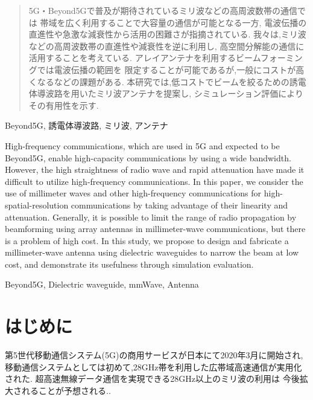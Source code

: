 \documentclass[technicalreport]{ieicej}
\begin{document}
\begin{abstract}
  5G・Beyond5Gで普及が期待されているミリ波などの高周波数帯の通信では
  帯域を広く利用することで大容量の通信が可能となる一方,
  電波伝播の直進性や急激な減衰性から活用の困難さが指摘されている.
  我々は,ミリ波などの高周波数帯の直進性や減衰性を逆に利用し,
  高空間分解能の通信に活用することを考えている.
  アレイアンテナを利用するビームフォーミングでは電波伝播の範囲を
  限定することが可能であるが,一般にコストが高くなるなどの課題がある.
  本研究では,低コストでビームを絞るための誘電体導波路を用いたミリ波アンテナを提案し,
  シミュレーション評価によりその有用性を示す.
\end{abstract}
\begin{keyword}
Beyond5G, 誘電体導波路, ミリ波, アンテナ
\end{keyword}
\begin{eabstract}
High-frequency communications,
which are used in 5G and expected to be Beyond5G,
enable high-capacity communications by using a wide bandwidth.
However, the high straightness of radio wave
and rapid attenuation
have made it difficult to utilize high-frequency communications.
In this paper, we consider the use of millimeter waves and
other high-frequency communications for high-spatial-resolution communications
by taking advantage of their linearity and attenuation.
Generally, it is possible to limit the range of radio propagation by
beamforming using array antennas in millimeter-wave communications,
but there is a problem of high cost.
In this study,
we propose to design and fabricate a millimeter-wave antenna using
dielectric waveguides to narrow the beam at low cost,
and demonstrate its usefulness through simulation evaluation.
\end{eabstract}
\begin{ekeyword}
Beyond5G, Dielectric waveguide, mmWave, Antenna
\end{ekeyword}
\maketitle

\section{はじめに}

第5世代移動通信システム(5G)の商用サービスが日本にて2020年3月に開始され,
移動通信システムとしては初めて,28GHz帯を利用した広帯域高速通信が実用化された.
超高速無線データ通信を実現できる28GHz以上のミリ波の利用は
今後拡大されることが予想される.\cite{docomo_6G_white_paper}.
\end{document}
